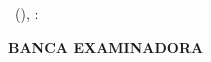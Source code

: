 
% 

\begin{folhadeaprovacao}
\DoubleSpacing
\begin{center}

	{\ABNTEXchapterfont\imprimirautor}

	\vfill

	{\ABNTEXchapterfont\imprimirtitulo}

	\vspace*{1cm}

	\hspace{.45\textwidth}
	\begin{minipage}{.5\textwidth}
	\begin{SingleSpace}
		\imprimirpreambulo
	\end{SingleSpace}
	\end{minipage}

	\vspace*{1.5cm}
	
	\imprimirlocal ~(\estado), \Data :
	
	\assinatura{\textbf{\imprimirorientador} \\ \nomeinstituicao}
	
	\vspace*{1.5cm}
	\textbf{BANCA EXAMINADORA}

	\assinatura{\textbf{\primeiroavaliador}\\ \primeiroavaliadorafiliacao}
	\assinatura{\textbf{\segundoavaliador}\\ \segundoavaliadorafiliacao}	
\end{center}
\end{folhadeaprovacao}